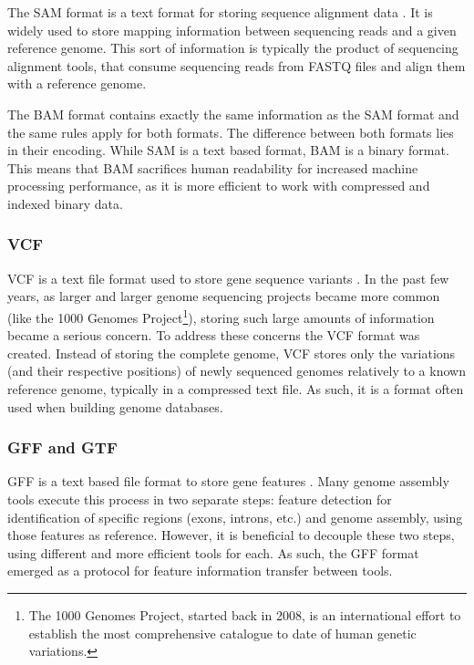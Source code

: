 The SAM format is a text format for storing sequence alignment data
\cite{genome:sam}. It is widely used to store mapping information between
sequencing reads and a given reference genome. This sort of information is
typically the product of sequencing alignment tools, that consume sequencing
reads from FASTQ files and align them with a reference genome.

The BAM format contains exactly the same information as the SAM format and the
same rules apply for both formats. The difference between both formats lies in
their encoding. While SAM is a text based format, BAM is a binary format. This
means that BAM sacrifices human readability for increased machine processing
performance, as it is more efficient to work with compressed and indexed binary
data.

\subsubsection*{VCF}

VCF is a text file format used to store gene sequence variants \cite{smith13}.
In the past few years, as larger and larger genome sequencing projects became
more common (like the 1000 Genomes Project\footnote{The 1000 Genomes Project,
started back in 2008, is an international effort to establish the most
comprehensive catalogue to date of human genetic variations.}), storing such
large amounts of information became a serious concern. To address these concerns
the VCF format was created. Instead of storing the complete genome, VCF stores
only the variations (and their respective positions) of newly sequenced genomes
relatively to a known reference genome, typically in a compressed text file. As
such, it is a format often used when building genome databases.

\subsubsection*{GFF and GTF}

GFF is a text based file format to store gene features \cite{sanger11}. Many
genome assembly tools execute this process in two separate steps: feature
detection for identification of specific regions (exons, introns, etc.) and
genome assembly, using those features as reference. However, it is beneficial to
decouple these two steps, using different and more efficient tools for each. As
such, the GFF format emerged as a protocol for feature information transfer
between tools.

